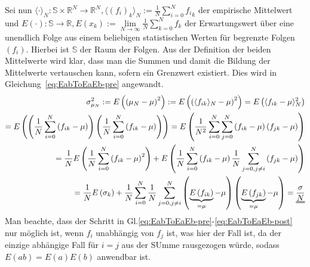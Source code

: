 \documentclass[german,bibnum,beleg,zihtitle,german,hyperref,utf8]{zihpub}
\begin{document}
Sei nun $\langle \cdot \rangle_N: \mathbb{S}\times \mathbb{R}^N \rightarrow \mathbb{R}^N, \langle (f_i)_k \rangle_N:= \frac{1}{N}\sum\limits_{i=0}^N {f_i}_k$ der empirische Mittelwert und $E(\cdot):\mathbb{S}\rightarrow \mathbb{R}, E\left( x_k \right):= \lim\limits_{N\rightarrow \infty} \frac{1}{N} \sum\limits_{k=0}^N f_k$ der Erwartungswert über eine unendlich Folge aus einem beliebigen statistischen Werten für begrenzte Folgen $(f_i)$. Hierbei ist $\mathbb{S}$ der Raum der Folgen. Aus der Definition der beiden Mittelwerte wird klar, dass man die Summen und damit die Bildung der Mittelwerte vertauschen kann, sofern ein Grenzwert existiert. Dies wird in Gleichung~\ref{eq:EabToEaEb-pre} angewandt.
\begin{align}
	\sigma_{\mu_N}^2
   := E\left( \left( \mu_N - \mu \right)^2 \right)
   := E\left( \left( \langle f_{ik} \rangle_N - \mu \right)^2 \right)
	= E\left( \langle f_{ik} - \mu \rangle_N^2 \right)
\\  = E\left( 
	  \left( \frac{1}{N} \sum\limits_{i=0}^N \left(f_{ik}-\mu\right) \right) 
	  \left( \frac{1}{N} \sum\limits_{i=0}^N \left(f_{ik}-\mu\right) \right) 
	  \right) 
	= E\left( \frac{1}{N^2} \sum\limits_{i=0}^N \sum\limits_{j=0}^N 
		      \left( f_{ik}-\mu \right) \left( f_{jk}-\mu \right) \right)
    \\  
	\label{eq:EabToEaEb-pre}
	= \frac{1}{N} E\left( 
		 \frac{1}{N} \sum\limits_{i=0}^N \left( f_{ik}-\mu \right)^2
      \right)
    + E\left( \frac{1}{N} \sum\limits_{i=0}^N \left( f_{ik}-\mu \right)
      \frac{1}{N} \sum\limits_{j=0,j\neq i}^N \left( f_{jk}-\mu \right) \right) 
    \\ 
	\label{eq:EabToEaEb-post}
    = \frac{1}{N} E\left( \sigma_k \right) 
    + \frac{1}{N} \sum\limits_{i=0}^N 
      \frac{1}{N} \sum\limits_{j=0,j\neq i}^N 
      \left( \underbrace{E\left(f_{ik}\right)}_{=\mu}-\mu \right)
      \left( \underbrace{E\left(f_{jk}\right)}_{=\mu}-\mu \right)
	= \uuline{ \frac{\sigma}{N} }
\end{align}
Man beachte, dass der Schritt in Gl.\ref{eq:EabToEaEb-pre}-\ref{eq:EabToEaEb-post} nur möglich ist, wenn $f_i$ unabhängig von $f_j$ ist, was hier der Fall ist, da der einzige abhängige Fall für $i=j$ aus der SUmme rausgezogen würde, sodass $E(a b)=E(a)E(b)$ anwendbar ist.
\end{document}
